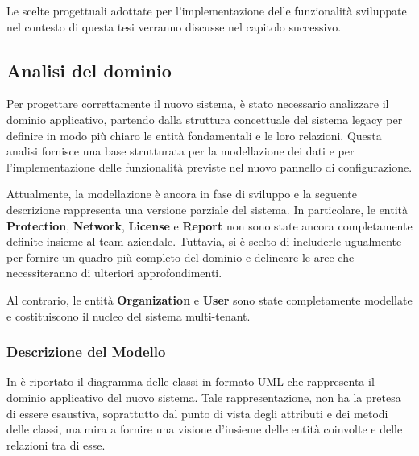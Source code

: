 Le scelte progettuali adottate per l'implementazione delle funzionalità sviluppate nel contesto di questa tesi verranno discusse nel capitolo successivo.

\subsection{Analisi del dominio}
Per progettare correttamente il nuovo sistema, è stato necessario analizzare il dominio applicativo, partendo dalla struttura concettuale del sistema legacy per definire in modo più chiaro le entità fondamentali e le loro relazioni. Questa analisi fornisce una base strutturata per la modellazione dei dati e per l'implementazione delle funzionalità previste nel nuovo pannello di configurazione.

Attualmente, la modellazione è ancora in fase di sviluppo e la seguente descrizione rappresenta una versione parziale del sistema. In particolare, le entità \textbf{Protection}, \textbf{Network}, \textbf{License} e \textbf{Report} non sono state ancora completamente definite insieme al team aziendale. Tuttavia, si è scelto di includerle ugualmente per fornire un quadro più completo del dominio e delineare le aree che necessiteranno di ulteriori approfondimenti.

Al contrario, le entità \textbf{Organization} e \textbf{User} sono state completamente modellate e costituiscono il nucleo del sistema multi-tenant.

\subsubsection{Descrizione del Modello}
In  è riportato il diagramma delle classi in formato UML che rappresenta il dominio applicativo del nuovo sistema. Tale rappresentazione, non ha la pretesa di essere esaustiva, soprattutto dal punto di vista degli attributi e dei metodi delle classi, ma mira a fornire una visione d'insieme delle entità coinvolte e delle relazioni tra di esse.

